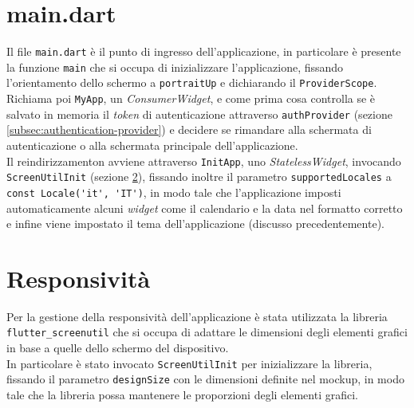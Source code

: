 \section{main.dart}
\label{sec:main}

Il file \lstinline{main.dart} è il punto di ingresso dell'applicazione, in particolare è presente la funzione \lstinline{main} che si occupa di inizializzare l'applicazione, fissando l'orientamento dello schermo a \lstinline{portraitUp} e dichiarando il \lstinline{ProviderScope}. \\
Richiama poi \lstinline{MyApp}, un \emph{ConsumerWidget}, e come prima cosa controlla se è salvato in memoria il \emph{token} di autenticazione attraverso \lstinline{authProvider} (sezione \ref{subsec:authentication-provider}) e decidere se rimandare alla schermata di autenticazione o alla schermata principale dell'applicazione. \\
Il reindirizzamenton avviene attraverso \lstinline{InitApp}, uno \emph{StatelessWidget}, invocando \lstinline{ScreenUtilInit} (sezione \ref{sec:responsivity}), fissando inoltre il parametro \lstinline{supportedLocales} a \lstinline{const Locale('it', 'IT')}, in modo tale che l'applicazione imposti automaticamente alcuni \emph{widget} come il calendario e la data nel formatto corretto e infine viene impostato il tema dell'applicazione (discusso precedentemente).

\section{Responsività}
\label{sec:responsivity}

Per la gestione della responsività dell'applicazione è stata utilizzata la libreria \lstinline{flutter_screenutil}\cite{site:screenutil} che si occupa di adattare le dimensioni degli elementi grafici in base a quelle dello schermo del dispositivo. \\
In particolare è stato invocato \lstinline{ScreenUtilInit} per inizializzare la libreria, fissando il parametro \lstinline{designSize} con le dimensioni definite nel \gls{mockup}\glsoccur, in modo tale che la libreria possa mantenere le proporzioni degli elementi grafici. 



